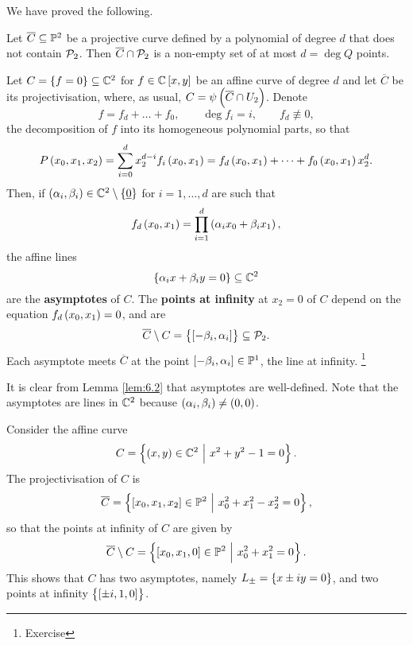 We have proved the following.

\begin{theorem}
Let $ \overline{C} \subseteq \mathbb{P}^2 $ be a projective curve defined by a polynomial of degree $ d $ that does not contain $ \mathcal{P}_2 $. Then $ \overline{C} \cap \mathcal{P}_2 $ is a non-empty set of at most $ d = \deg Q $ points.
\end{theorem}

\begin{definition}
Let $ C = \cbr{f = 0} \subseteq \CC^2 $ for $ f \in \CC\sbr{x, y} $ be an affine curve of degree $ d $ and let $ \overline{C} $ be its projectivisation, where, as usual, $ C = \psi\br{\overline{C} \cap U_2} $. Denote
$$ f = f_d + \dots + f_0, \qquad \deg f_i = i, \qquad f_d \not\equiv 0, $$
the decomposition of $ f $ into its homogeneous polynomial parts, so that
$$ P\br{x_0, x_1, x_2} = \sum_{i = 0}^d x_2^{d - i}f_i\br{x_0, x_1} = f_d\br{x_0, x_1} + \dots + f_0\br{x_0, x_1}x_2^d. $$
Then, if $ \br{\alpha_i, \beta_i} \in \CC^2 \setminus \cbr{\underline{0}} $ for $ i = 1, \dots, d $ are such that
$$ f_d\br{x_0, x_1} = \prod_{i = 1}^d \br{\alpha_ix_0 + \beta_ix_1}, $$
the affine lines
$$ \cbr{\alpha_ix + \beta_iy = 0} \subseteq \CC^2 $$
are the \textbf{asymptotes} of $ C $. The \textbf{points at infinity} at $ x_2 = 0 $ of $ C $ depend on the equation $ f_d\br{x_0, x_1} = 0 $, and are
$$ \overline{C} \setminus C = \cbr{\sbr{-\beta_i, \alpha_i}} \subseteq \PPP_2. $$
Each asymptote meets $ \overline{C} $ at the point $ \sbr{-\beta_i, \alpha_i} \in \PP^1 $, the line at infinity. \footnote{Exercise}
\end{definition}

\begin{remark}
It is clear from Lemma \ref{lem:6.2} that asymptotes are well-defined. Note that the asymptotes are lines in $ \mathbb{C}^2 $ because $ \br{\alpha_i, \beta_i} \ne \br{0, 0} $.
\end{remark}

\begin{example}
Consider the affine curve
$$ C = \cbr{\br{x, y} \in \CC^2 \st x^2 + y^2 - 1 = 0}. $$
The projectivisation of $ C $ is
$$ \overline{C} = \cbr{\sbr{x_0, x_1, x_2} \in \PP^2 \st x_0^2 + x_1^2 - x_2^2 = 0}, $$
so that the points at infinity of $ C $ are given by
$$ \overline{C} \setminus C = \cbr{\sbr{x_0, x_1, 0} \in \PP^2 \st x_0^2 + x_1^2 = 0}. $$
This shows that $ C $ has two asymptotes, namely $ L_\pm = \cbr{x \pm iy = 0} $, and two points at infinity $ \cbr{\sbr{\pm i, 1, 0}} $.
\end{example}


